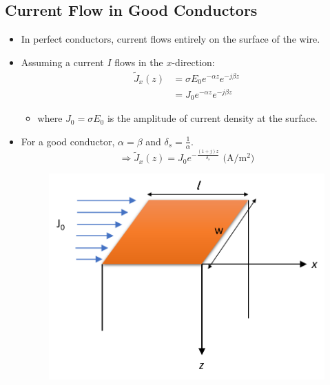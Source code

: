 \documentclass[a4paper]{article}
\begin{document}
\subsection{Current Flow in Good Conductors}
\begin{itemize}
    \item In perfect conductors, current flows entirely on the surface of the wire.
    \item Assuming a current $I$ flows in the $x$-direction:
    \begin{align*}
        \widetilde{J}_x(z) &= \sigma E_0e^{-\alpha z}e^{-j\beta z}\\
        &=  J_0e^{-\alpha z}e^{-j\beta z}
    \end{align*}
    \begin{itemize}[label=$\circ$]
        \item where $J_0 = \sigma E_0$ is the amplitude of current density at the surface.
    \end{itemize}
    \item For a good conductor, $\alpha = \beta$ and $\delta_s = \displaystyle\frac{1}{\alpha}$.
    $$\Rightarrow \widetilde{J}_x(z) = J_0e^{-\frac{(1+j)z}{\delta_s}}\text{ (A/}\text{m}^2)$$
    \noindent
    \begin{minipage}{0.4\textwidth}
        \begin{figure}[H]
        \centering
        \includegraphics[width=\linewidth]{planecurrent.png}
        \end{figure}
    \end{minipage}%
    \begin{minipage}{0.3\textwidth}

\end{minipage}
\end{itemize}
\end{document}
